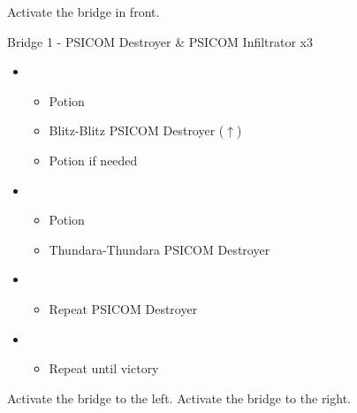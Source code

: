 \begin{multicols}{2}
Activate the bridge in front.

\begin{battle}{Bridge 1 - PSICOM Destroyer \& PSICOM Infiltrator x3}
\begin{itemize}
    \item \first
    \begin{itemize}
        \item Potion
        \item Blitz-Blitz PSICOM Destroyer ($\uparrow$)
        \item Potion if needed
    \end{itemize}
    \item \fourth
    \begin{itemize}
        \item Potion
        \item Thundara-Thundara PSICOM Destroyer
    \end{itemize}
    \item \first
    \begin{itemize}
        \item Repeat PSICOM Destroyer
    \end{itemize}
    \item \sixth
    \begin{itemize}
        \item Repeat until victory
    \end{itemize}
\end{itemize}
  
\end{battle}
\columnbreak
Activate the bridge to the left.  Activate the bridge to the right.


\end{multicols}
